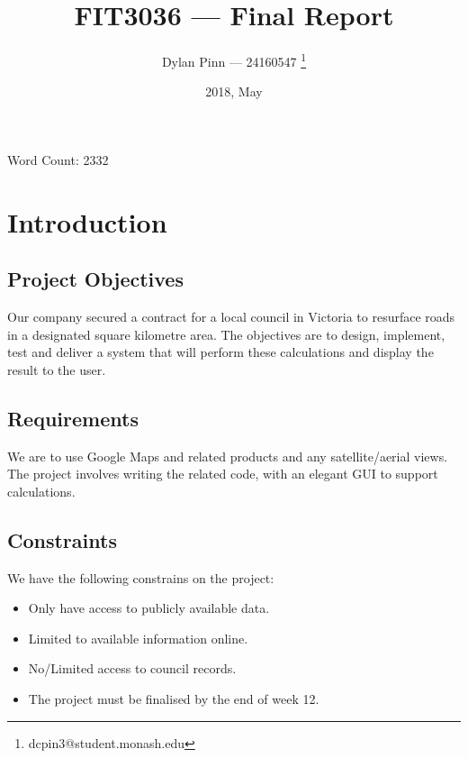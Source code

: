 \documentclass[a4paper,11pt]{article}
\title{FIT3036 --- Final Report}
\author{Dylan Pinn --- 24160547 \thanks{dcpin3@student.monash.edu}}
\date{2018, May}
\begin{document}
\maketitle
\vspace{-1ex}
\begin{center}
  Word Count: 2332
\end{center}

\begin{abstract}
\end{abstract}
\pagebreak

\tableofcontents
\pagebreak

\section{Introduction}

\subsection{Project Objectives}

Our company secured a contract for a local council in Victoria to resurface
roads in a designated square kilometre area. The objectives are to design,
implement, test and deliver a system that will perform these calculations and
display the result to the user.

\subsection{Requirements}

We are to use Google Maps and related products and any satellite/aerial views.
The project involves writing the related code, with an elegant GUI to support
calculations. \autocite[2]{intro:1}

\subsection{Constraints}

We have the following constrains on the project:

\begin{itemize}
  \item Only have access to publicly available data.
  \item Limited to available information online.
  \item No/Limited access to council records.
  \item The project must be finalised by the end of week 12.
\end{itemize}
\end{document}
